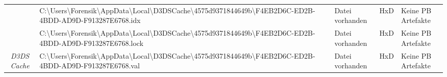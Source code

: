 \begin{appendices}
{\begin{landscape}
\begin{table}[h!]
{\begin{tabular}{cllll}
		\multicolumn{1}{|c|}{}                                                   & \multicolumn{1}{l|}{\cellcolor[HTML]{FE0000}C:\textbackslash{}Users\textbackslash{}Forensik\textbackslash{}AppData\textbackslash{}Local\textbackslash{}D3DSCache\textbackslash{}4575d9371844649b\textbackslash{}F4EB2D6C-ED2B-4BDD-AD9D-F913287E6768.idx}                                                                                & \multicolumn{1}{l|}{\cellcolor[HTML]{009901}Datei vorhanden}                                        & \multicolumn{1}{l|}{HxD}                                   & \multicolumn{1}{l|}{\cellcolor[HTML]{F8A102}Keine PB Artefakte} \\ \cline{2-5} 
		\multicolumn{1}{|c|}{}                                                   & \multicolumn{1}{l|}{\cellcolor[HTML]{FE0000}C:\textbackslash{}Users\textbackslash{}Forensik\textbackslash{}AppData\textbackslash{}Local\textbackslash{}D3DSCache\textbackslash{}4575d9371844649b\textbackslash{}F4EB2D6C-ED2B-4BDD-AD9D-F913287E6768.lock}                                                                               & \multicolumn{1}{l|}{\cellcolor[HTML]{009901}Datei vorhanden}                                        & \multicolumn{1}{l|}{HxD}                                   & \multicolumn{1}{l|}{\cellcolor[HTML]{F8A102}Keine PB Artefakte} \\ \cline{2-5} 
		\multicolumn{1}{|c|}{\multirow{-3}{*}{\textit{D3DS Cache}}}              & \cellcolor[HTML]{FE0000}C:\textbackslash{}Users\textbackslash{}Forensik\textbackslash{}AppData\textbackslash{}Local\textbackslash{}D3DSCache\textbackslash{}4575d9371844649b\textbackslash{}F4EB2D6C-ED2B-4BDD-AD9D-F913287E6768.val                                                                                                     & \multicolumn{1}{l|}{\cellcolor[HTML]{009901}Datei vorhanden}                                        & \multicolumn{1}{l|}{HxD}                                   & \multicolumn{1}{l|}{\cellcolor[HTML]{F8A102}Keine PB Artefakte} \\ \hline
	\end{tabular}
}
\end{table}
\end{landscape}
}
\restoregeometry


\end{appendices}
